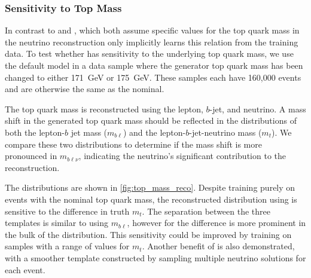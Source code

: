 \subsubsection{Sensitivity to Top Mass}

In contrast to \vweight and \ellipse, which both assume specific values for the top quark mass in the neutrino reconstruction \vvflows only implicitly learns this relation from the training data.
To test whether \vvflows has sensitivity to the underlying top quark mass, we use the default \vvflows model in a data sample where the generator top quark mass has been changed to either 171~GeV or 175~GeV.
These samples each have 160,000 events and are otherwise the same as the nominal.

The top quark mass is reconstructed using the lepton, $b$-jet, and neutrino.
A mass shift in the generated top quark mass should be reflected in the distributions of both the lepton-$b$ jet mass ($m_{b\ell}$) and the lepton-$b$-jet-neutrino mass ($m_t$).
We compare these two distributions to determine if the mass shift is more pronounced in $m_{b\ell\nu}$, indicating the neutrino's significant contribution to the reconstruction.

The distributions are shown in \cref{fig:top_mass_reco}.
Despite training purely on events with the nominal top quark mass, the reconstructed distribution using \vvflows is sensitive to the difference in truth $m_t$.
The separation between the three templates is similar to using $m_{b\ell}$, however for \vvflows the difference is more prominent in the bulk of the distribution.
This sensitivity could be improved by training \vvflows on samples with a range of values for $m_t$.
Another benefit of \vvflows is also demonstrated, with a smoother template constructed by sampling multiple neutrino solutions for each event.

